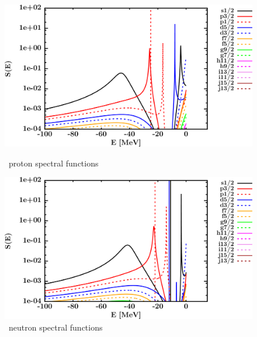 \begin{figure}[hbtp]
    \centering
    \begin{minipage}{0.42\textwidth}
        \centering
        \includegraphics[width=\textwidth]{figures/o18_protonSpectralFunctions.png}
        \caption*{\oEight\ proton spectral functions}
        \label{DOMFitData_o18_proton_spectralFunctions}
    \end{minipage}\hspace{6pt}
    \begin{minipage}{0.42\textwidth}
        \centering
        \includegraphics[width=\linewidth]{figures/o18_neutronSpectralFunctions.png}
        \caption*{\oEight\ neutron spectral functions}
        \label{DOMFitData_o18_neutron_spectralFunctions}
    \end{minipage}
\end{figure}
